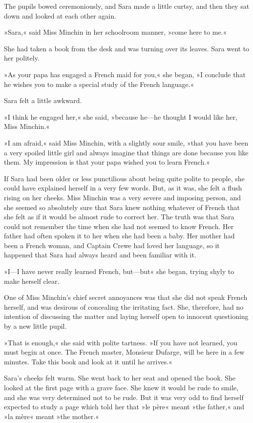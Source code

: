The pupils bowed ceremoniously, and Sara made a little curtsy, and then they sat down and looked at each other again.

»Sara,« said Miss Minchin in her schoolroom manner, »come here to me.«

She had taken a book from the desk and was turning over its leaves. Sara went to her politely.

»As your papa has engaged a French maid for you,« she began, »I conclude that he wishes you to make a special study of the French language.«

Sara felt a little awkward.

»I think he engaged her,« she said, »because he—he thought I would like her, Miss Minchin.«

»I am afraid,« said Miss Minchin, with a slightly sour smile, »that you have been a very spoiled little girl and always imagine that things are done because you like them. My impression is that your papa wished you to learn French.«

If Sara had been older or less punctilious about being quite polite to people, she could have explained herself in a very few words. But, as it was, she felt a flush rising on her cheeks. Miss Minchin was a very severe and imposing person, and she seemed so absolutely sure that Sara knew nothing whatever of French that she felt as if it would be almost rude to correct her. The truth was that Sara could not remember the time when she had not seemed to know French. Her father had often spoken it to her when she had been a baby. Her mother had been a French woman, and Captain Crewe had loved her language, so it happened that Sara had always heard and been familiar with it.

»I—I have never really learned French, but—but\longdash« she began, trying shyly to make herself clear.

One of Miss Minchin's chief secret annoyances was that she did not speak French herself, and was desirous of concealing the irritating fact. She, therefore, had no intention of discussing the matter and laying herself open to innocent questioning by a new little pupil.

»That is enough,« she said with polite tartness. »If you have not learned, you must begin at once. The French master, Monsieur Dufarge, will be here in a few minutes. Take this book and look at it until he arrives.«

Sara's cheeks felt warm. She went back to her seat and opened the book. She looked at the first page with a grave face. She knew it would be rude to smile, and she was very determined not to be rude. But it was very odd to find herself expected to study a page which told her that »le père« meant »the father,« and »la mère« meant »the mother.«

